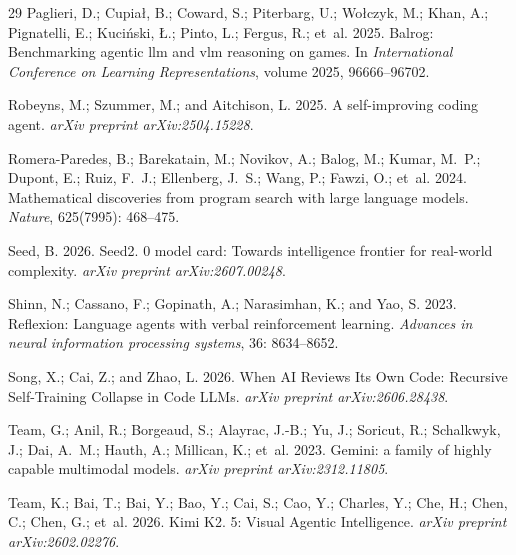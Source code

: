 \documentclass[letterpaper]{article} \usepackage{aaai2027}  \usepackage[hyphens]{url}  \usepackage{graphicx} \urlstyle{rm} \def\UrlFont{\rm}  \usepackage{natbib}  \usepackage{caption} \usepackage{amsfonts} \usepackage{multirow} \frenchspacing  \usepackage{algorithm}
\begin{document}
\begin{thebibliography}{29}
Paglieri, D.; Cupia{\l}, B.; Coward, S.; Piterbarg, U.; Wo{\l}czyk, M.; Khan,
  A.; Pignatelli, E.; Kuci{\'n}ski, {\L}.; Pinto, L.; Fergus, R.; et~al. 2025.
\newblock Balrog: Benchmarking agentic llm and vlm reasoning on games.
\newblock In \emph{International Conference on Learning Representations},
  volume 2025, 96666--96702.

Robeyns, M.; Szummer, M.; and Aitchison, L. 2025.
\newblock A self-improving coding agent.
\newblock \emph{arXiv preprint arXiv:2504.15228}.

Romera-Paredes, B.; Barekatain, M.; Novikov, A.; Balog, M.; Kumar, M.~P.;
  Dupont, E.; Ruiz, F.~J.; Ellenberg, J.~S.; Wang, P.; Fawzi, O.; et~al. 2024.
\newblock Mathematical discoveries from program search with large language
  models.
\newblock \emph{Nature}, 625(7995): 468--475.

Seed, B. 2026.
\newblock Seed2. 0 model card: Towards intelligence frontier for real-world
  complexity.
\newblock \emph{arXiv preprint arXiv:2607.00248}.

Shinn, N.; Cassano, F.; Gopinath, A.; Narasimhan, K.; and Yao, S. 2023.
\newblock Reflexion: Language agents with verbal reinforcement learning.
\newblock \emph{Advances in neural information processing systems}, 36:
  8634--8652.

Song, X.; Cai, Z.; and Zhao, L. 2026.
\newblock When AI Reviews Its Own Code: Recursive Self-Training Collapse in
  Code LLMs.
\newblock \emph{arXiv preprint arXiv:2606.28438}.

Team, G.; Anil, R.; Borgeaud, S.; Alayrac, J.-B.; Yu, J.; Soricut, R.;
  Schalkwyk, J.; Dai, A.~M.; Hauth, A.; Millican, K.; et~al. 2023.
\newblock Gemini: a family of highly capable multimodal models.
\newblock \emph{arXiv preprint arXiv:2312.11805}.

Team, K.; Bai, T.; Bai, Y.; Bao, Y.; Cai, S.; Cao, Y.; Charles, Y.; Che, H.;
  Chen, C.; Chen, G.; et~al. 2026.
\newblock Kimi K2. 5: Visual Agentic Intelligence.
\newblock \emph{arXiv preprint arXiv:2602.02276}.


\end{thebibliography}
\end{document}
